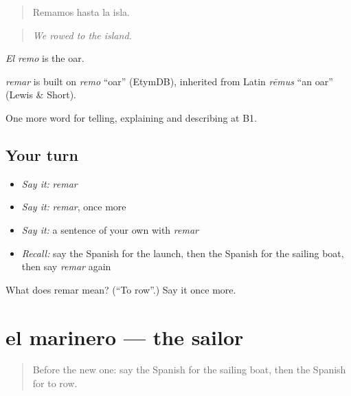\begin{quote}
Remamos hasta la isla.
\end{quote}

\begin{quote}
\emph{We rowed to the island.}
\end{quote}

\emph{El remo} is the oar.

\begin{cousinweb}
\emph{remar} is built on \emph{remo} \textquotedblleft{}oar\textquotedblright{} (EtymDB), inherited from Latin \emph{rēmus} \textquotedblleft{}an oar\textquotedblright{} (Lewis \& Short).
\end{cousinweb}

\begin{grammarlens}[title={What you've built}]
One more word for telling, explaining and describing at B1.
\end{grammarlens}

\subsection*{Your turn}
\begin{itemize}
\raggedright
  \item \emph{Say it:} \emph{remar}
  \item \emph{Say it:} \emph{remar}, once more
  \item \emph{Say it:} a sentence of your own with \emph{remar}
  \item \emph{Recall:} say the Spanish for the launch, then the Spanish for the sailing boat, then say \emph{remar} again
\end{itemize}

\begin{tcolorbox}[breakable,colback=teal!4,colframe=teal!35!black,title={Before you move on}]
What does remar mean? (\textquotedblleft{}To row\textquotedblright{}.) Say it once more.
\end{tcolorbox}
\section[el marinero]{el marinero — the sailor}

\label{lesson:ES-C659-marinero}



\begin{quote}
Before the new one: say the Spanish for the sailing boat, then the Spanish for to row.
\end{quote}

